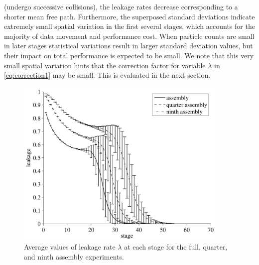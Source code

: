 (undergo successive collisions), the leakage rates decrease corresponding to a
shorter mean free path. Furthermore, the superposed standard deviations indicate
extremely small spatial variation in the first several stages, which accounts
for the majority of data movement and performance cost. When particle counts are
small in later stages statistical variations result in larger standard deviation
values, but their impact on total performance is expected to be small. We note
that this very small spatial variation hints that the correction factor for
variable $\lambda$ in \eqref{eq:correction1} may be small. This is evaluated in
the next section.
\begin{figure}[ht!]
  \centering
  \includegraphics[width=4.0in]{figures/ch5/avg_leakage.pdf}
  \caption{Average values of leakage rate $\lambda$ at each stage for the full,
    quarter, and ninth assembly experiments.}
  \label{fig:avg-leakage}
\end{figure}

